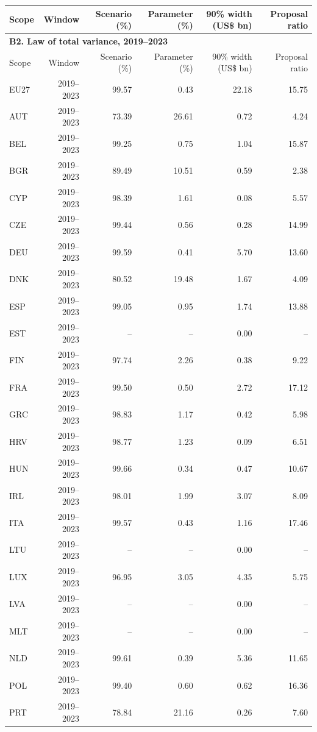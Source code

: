 {\begin{longtable}{@{}lrrrrr@{}}
\toprule
Scope & Window & Scenario (\%) & Parameter (\%) & 90\% width (US\$ bn) & Proposal ratio \\
\midrule
\endfirsthead
\multicolumn{6}{l}{\textbf{B2. Law of total variance, 2019–2023}} \\
\toprule
Scope & Window & Scenario (\%) & Parameter (\%) & 90\% width (US\$ bn) & Proposal ratio \\
\midrule
\endhead
\midrule
\endfoot
\bottomrule
\endlastfoot
EU27 & 2019–2023 & 99.57 &  0.43 & 22.18 & 15.75 \\
AUT & 2019–2023 & 73.39 & 26.61 &  0.72 &  4.24 \\
BEL & 2019–2023 & 99.25 &  0.75 &  1.04 & 15.87 \\
BGR & 2019–2023 & 89.49 & 10.51 &  0.59 &  2.38 \\
CYP & 2019–2023 & 98.39 &  1.61 &  0.08 &  5.57 \\
CZE & 2019–2023 & 99.44 &  0.56 &  0.28 & 14.99 \\
DEU & 2019–2023 & 99.59 &  0.41 &  5.70 & 13.60 \\
DNK & 2019–2023 & 80.52 & 19.48 &  1.67 &  4.09 \\
ESP & 2019–2023 & 99.05 &  0.95 &  1.74 & 13.88 \\
EST & 2019–2023 & -- & -- &  0.00 & -- \\
FIN & 2019–2023 & 97.74 &  2.26 &  0.38 &  9.22 \\
FRA & 2019–2023 & 99.50 &  0.50 &  2.72 & 17.12 \\
GRC & 2019–2023 & 98.83 &  1.17 &  0.42 &  5.98 \\
HRV & 2019–2023 & 98.77 &  1.23 &  0.09 &  6.51 \\
HUN & 2019–2023 & 99.66 &  0.34 &  0.47 & 10.67 \\
IRL & 2019–2023 & 98.01 &  1.99 &  3.07 &  8.09 \\
ITA & 2019–2023 & 99.57 &  0.43 &  1.16 & 17.46 \\
LTU & 2019–2023 & -- & -- &  0.00 & -- \\
LUX & 2019–2023 & 96.95 &  3.05 &  4.35 &  5.75 \\
LVA & 2019–2023 & -- & -- &  0.00 & -- \\
MLT & 2019–2023 & -- & -- &  0.00 & -- \\
NLD & 2019–2023 & 99.61 &  0.39 &  5.36 & 11.65 \\
POL & 2019–2023 & 99.40 &  0.60 &  0.62 & 16.36 \\
PRT & 2019–2023 & 78.84 & 21.16 &  0.26 &  7.60 \\

\end{longtable}}
